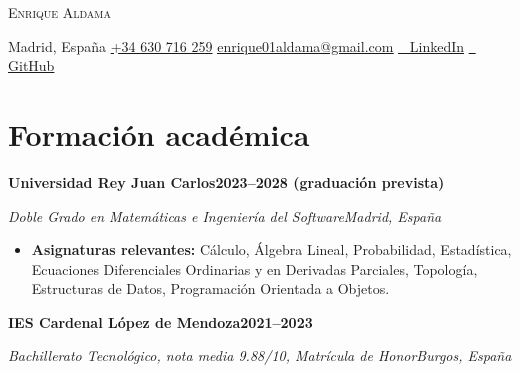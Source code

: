 \documentclass[10pt,letterpaper]{article}
\newenvironment{cvblock}{%
  \begin{list}{}{%
    \setlength{\leftmargin}{10.8pt}%
    \setlength{\rightmargin}{5.4pt}%
    \setlength{\topsep}{0pt}%
    \setlength{\partopsep}{0pt}%
    \setlength{\parsep}{0pt}%
    \setlength{\itemsep}{0pt}%
  }\item[]%
}{\end{list}}
\newcommand{\cventry}[4]{%
  {\fontsize{11}{13}\selectfont\textbf{#1}\hfill\textbf{#2}\par}%
  \textit{#3}\hfill\textit{#4}\par
}
\newenvironment{cvbullets}{%
  \begin{itemize}[leftmargin=24pt,label=\textbullet,
    labelsep=5pt,itemsep=1pt,topsep=1pt,parsep=0pt,partopsep=0pt]%
}{\end{itemize}}
\newcommand{\cvspace}{\vspace{2pt}}
\begin{document}
\begin{center}
  {\fontsize{25}{29}\selectfont\scshape Enrique Aldama}\par
  \vspace{4pt}
  Madrid, España\enspace\textbar\enspace
  \href{tel:+34630716259}{+34 630 716 259}\enspace\textbar\enspace
  \href{mailto:enrique01aldama@gmail.com}{\underline{enrique01aldama@gmail.com}}\enspace\textbar\enspace
  \href{https://www.linkedin.com/in/enrique-aldama-moradillo/}{\textcolor{gray}{\faLinkedin\ } LinkedIn}\enspace\textbar\enspace
  \href{https://github.com/EnriqueAldama}{\textcolor{gray}{\faGithub\ } GitHub}
\end{center}
\vspace{-7pt}

\section{Formación académica}
\begin{cvblock}
  \cventry{Universidad Rey Juan Carlos}{2023--2028 (graduación prevista)}
    {Doble Grado en Matemáticas e Ingeniería del Software}{Madrid, España}
  \begin{cvbullets}
    \item \textbf{Asignaturas relevantes:} Cálculo, Álgebra Lineal, Probabilidad, Estadística, Ecuaciones Diferenciales Ordinarias y en Derivadas Parciales, Topología, Estructuras de Datos, Programación Orientada a Objetos.
  \end{cvbullets}
  \cvspace
  \cventry{IES Cardenal López de Mendoza}{2021--2023}
    {Bachillerato Tecnológico, nota media 9.88/10, Matrícula de Honor}{Burgos, España}
\end{cvblock}
\end{document}
